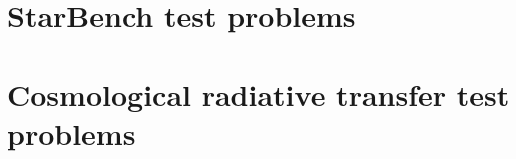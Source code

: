 \documentclass[a4paper,11pt]{report}
\begin{document}
\section{StarBench test problems}

\section{Cosmological radiative transfer test problems}



%

\end{document}
